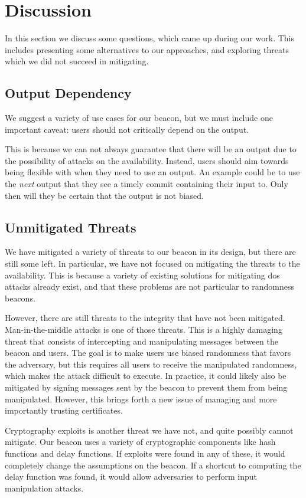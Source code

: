 \section{Discussion}%
\label{sec:discussion}
In this section we discuss some questions, which came up during our work.
This includes presenting some alternatives to our approaches, and exploring threats which we did not succeed in mitigating.

\subsection{Output Dependency}
We suggest a variety of use cases for our beacon, but we must include one important caveat: users should not critically depend on the output.

This is because we can not always guarantee that there will be an output due to the possibility of attacks on the availability.
Instead, users should aim towards being flexible with when they need to use an output.
An example could be to use the \textit{next} output that they see a timely commit containing their input to.
Only then will they be certain that the output is not biased.

\subsection{Unmitigated Threats}
We have mitigated a variety of threats to our beacon in its design, but there are still some left.
In particular, we have not focused on mitigating the threats to the availability.
This is because a variety of existing solutions for mitigating \gls{dos} attacks already exist, and that these problems are not particular to randomness beacons.

However, there are still threats to the integrity that have not been mitigated.
Man-in-the-middle attacks is one of those threats.
This is a highly damaging threat that consists of intercepting and manipulating messages between the beacon and users.
The goal is to make users use biased randomness that favors the adversary, but this requires all users to receive the manipulated randomness, which makes the attack difficult to execute.
In practice, it could likely also be mitigated by signing messages sent by the beacon to prevent them from being manipulated.
However, this brings forth a new issue of managing and more importantly trusting certificates.

Cryptography exploits is another threat we have not, and quite possibly cannot mitigate.
Our beacon uses a variety of cryptographic components like hash functions and delay functions.
If exploits were found in any of these, it would completely change the assumptions on the beacon.
If a shortcut to computing the delay function was found, it would allow adversaries to perform input manipulation attacks.

